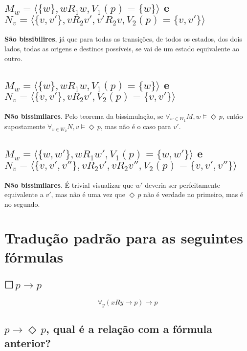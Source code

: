 \documentclass[11pt]{article}
\newcommand{\sq}{\Square \,}
\newcommand{\di}{\Diamond \,}
\newcommand{\imp}{\rightarrow}
\begin{document}
\subsection{$M_w = \langle \{w\}, wR_1w, V_1(p) = \{w\} \rangle$ e\\ 
$N_v = \langle \{v,v'\},vR_2v', v'R_2v, V_2(p) = \{v,v'\} \rangle$}


\textbf{São bissibilires}, já que para todas as transições, de todos os estados, dos dois lados, todas as origens e destinos possíveis, se vai de um estado equivalente ao outro.




\subsection{$M_w = \langle \{w\}, wR_1w, V_1(p) = \{w\} \rangle$ e\\ 
$N_v = \langle \{v,v'\},vR_2v', V_2(p) = \{v,v'\} \rangle$}

\textbf{Não bissimilares}. Pelo teorema da bissimulação, se $\forall_{w \in W_1} M, w \models \di p$, então supostamente $\forall_{v \in W_2} N, v \models \di p$, mas não é o caso para $v'$.



\subsection{$M_w = \langle \{w, w'\}, wR_1w', V_1(p) = \{w,w'\} \rangle$ e\\ 
$N_v = \langle \{v,v',v''\},vR_2v', vR_2v'', V_2(p) = \{v,v',v''\} \rangle$}


\textbf{Não bissimilares}. É trivial visualizar que $w'$ deveria ser perfeitamente equivalente a $v'$, mas não é uma vez que $\di p$ não é verdade no primeiro, mas é no segundo.


\section{Tradução padrão para as seguintes fórmulas}

\subsection{$ \sq p \imp p $}

\[ \forall_y ( xRy \imp p ) \imp p \]

\subsection{$ p \imp \di p $, qual é a relação com a fórmula anterior?}
\end{document}
